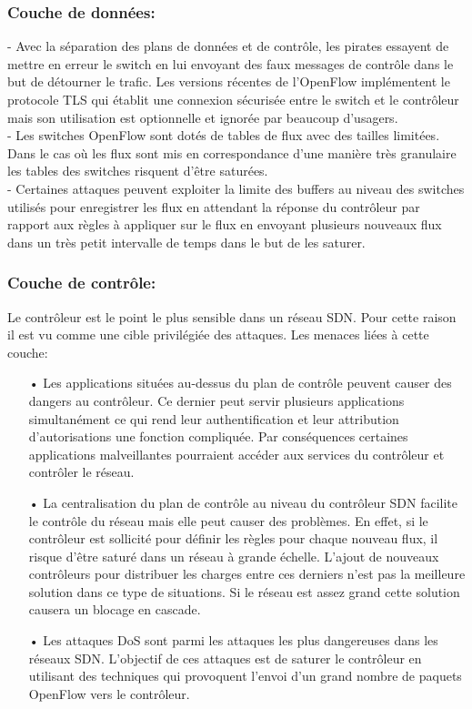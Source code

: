 \subsubsection{Couche de données:}
- Avec la séparation des plans de données et de contrôle, les pirates essayent de mettre en erreur le switch en lui envoyant des faux messages de contrôle dans le but de détourner le trafic. Les versions récentes de l’OpenFlow implémentent le protocole TLS qui établit une connexion sécurisée entre le switch et le contrôleur mais son utilisation est optionnelle et ignorée par beaucoup d’usagers.\\

- Les switches OpenFlow sont dotés de tables de flux avec des tailles limitées. Dans le cas où les flux sont mis en correspondance d’une manière très granulaire les tables des switches risquent d’être saturées.\\

- Certaines attaques peuvent exploiter la limite des buffers au niveau des switches utilisés pour enregistrer les flux en attendant la réponse du contrôleur par rapport aux règles à appliquer sur le flux  en envoyant plusieurs nouveaux flux dans un très petit intervalle de temps dans le but de les saturer.

\subsubsection{Couche de contrôle:} 
Le contrôleur est le point le plus sensible dans un réseau SDN. Pour cette raison il est vu comme une cible privilégiée des attaques. Les menaces liées à cette couche:\\
\begin{itemize}
\item[•]Les applications situées au-dessus du plan de contrôle peuvent causer des dangers au contrôleur. Ce dernier peut servir plusieurs applications simultanément ce qui rend leur authentification et leur attribution d’autorisations une fonction compliquée. Par conséquences certaines applications malveillantes pourraient accéder aux services du contrôleur et contrôler le réseau.\\
\item[•]La centralisation du plan de contrôle au niveau du contrôleur SDN facilite le contrôle du réseau mais elle peut causer des problèmes. En effet, si le contrôleur est sollicité pour définir les règles pour chaque nouveau flux, il risque d’être saturé dans un réseau à grande échelle. L’ajout de nouveaux contrôleurs pour distribuer les charges entre ces derniers n’est pas la meilleure solution dans ce type de situations. Si le réseau est assez grand cette solution causera un blocage en cascade.\\
\item[•]Les attaques DoS sont parmi les attaques les plus dangereuses dans les réseaux SDN. L’objectif de ces attaques est de saturer le contrôleur en utilisant des techniques qui provoquent l’envoi d’un grand nombre de paquets OpenFlow vers le contrôleur. 
\end{itemize}

